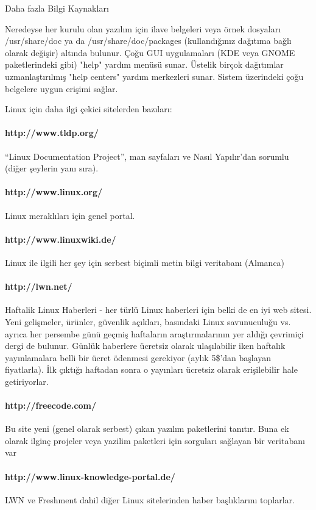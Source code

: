 \begin{section}{Daha fazla Bilgi Kaynakları}

Neredeyse her kurulu olan yazılım için ilave belgeleri veya örnek dosyaları /usr/share/doc ya da /usr/share/doc/packages (kullandığınız dağıtıma bağlı olarak değişir) altında bulunur. Çoğu GUI uygulamaları (KDE veya GNOME paketlerindeki gibi) "help" yardım menüsü sunar. Üstelik birçok dağıtımlar uzmanlaştırılmış "help centers" yardım merkezleri sunar. Sistem üzerindeki çoğu belgelere uygun erişimi sağlar.

Linux için daha ilgi çekici sitelerden bazıları:
\paragraph{http://www.tldp.org/}{“Linux Documentation Project”, man sayfaları ve Nasıl Yapılır'dan sorumlu (diğer şeylerin yanı sıra).}
\paragraph{http://www.linux.org/}{Linux meraklıları için genel portal.}
\paragraph{http://www.linuxwiki.de/}{Linux ile ilgili her şey için serbest biçimli metin bilgi veritabanı (Almanca)}
\paragraph{http://lwn.net/}{Haftalik Linux Haberleri - her türlü Linux haberleri için belki de en iyi web sitesi. Yeni gelişmeler, ürünler, güvenlik açıkları, basındaki Linux savunuculuğu vs. ayrıca her persembe günü geçmiş haftaların araştırmalarının yer aldığı çevrimiçi dergi de bulunur. Günlük haberlere ücretsiz olarak ulaşılabilir iken haftalık yayınlamalara belli bir ücret ödenmesi gerekiyor (aylık 5\$'dan başlayan fiyatlarla). İlk çıktığı haftadan sonra o yayınları ücretsiz olarak erişilebilir hale getiriyorlar.}
\paragraph{http://freecode.com/}{Bu site yeni (genel olarak serbest) çıkan yazılım paketlerini tanıtır. Buna ek olarak ilginç projeler veya yazilim paketleri için sorguları sağlayan bir veritabanı var}
\paragraph{http://www.linux-knowledge-portal.de/}{LWN ve Freshment dahil diğer Linux sitelerinden haber başlıklarını toplarlar.}


\end{section}
